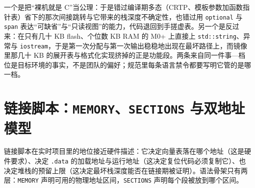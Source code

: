\documentclass[12pt,a4paper,fontset=fandol]{ctexbook}
\newcommand{\Tp}[1]{\texttt{#1}}
\newcommand{\Lang}[1]{\textsf{#1}}
\newcommand{\CL}{\Lang{C}}
\begin{document}
\begin{warning}[title={两个反方向的误判}]
一个是把``裸机就是 \CL{}''当公理：于是错过编译期多态（CRTP、模板参数加函数指针表）省下的那次间接跳转与它带来的栈深度不确定性，也错过用 \Tp{optional} 与 \Tp{span} 表达``可缺省''与``只读视图''的能力，代码退回到手搓虚表。另一个是反过来：在只有几十 KB flash、个位数 KB RAM 的 M0+ 上直接上 \Tp{std::string}、异常与 \Tp{iostream}，于是第一次分配与第一次输出稳稳地出现在最坏路径上，而镜像里那几十 KB 的展开表与格式化实现挤掉的正是功能段。两条来自同一件事---档位是目标环境的事实，不是团队的偏好；规范里每条语言禁令都要写明它管的是哪一档。
\end{warning}

\section{链接脚本：\Tp{MEMORY}、\Tp{SECTIONS} 与双地址模型}

\label{sec:ch01-linker}

链接脚本在实时项目里的地位接近硬件描述：它决定向量表落在哪个地址（这是硬件要求）、决定 \Tp{.data} 的加载地址与运行地址（这决定复位代码必须复制它）、也决定堆栈的预留上限（这决定最坏栈深度能否在链接期被证明）。语法骨架只有两层：\Tp{MEMORY} 声明可用的物理地址区间，\Tp{SECTIONS} 声明每个段被放到哪个区间。
\end{document}
